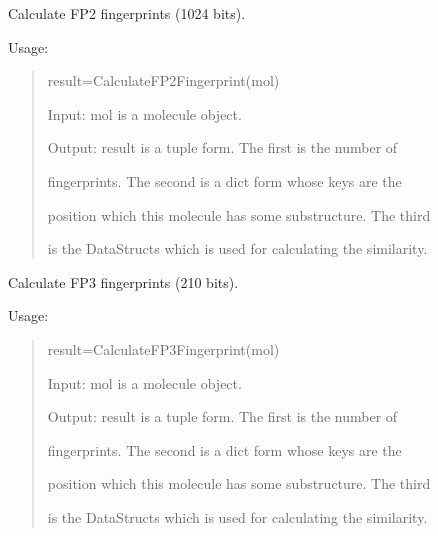 \documentclass[letterpaper,10pt,english]{sphinxmanual}
\begin{document}
\begin{fulllineitems}
\label{reference/fingerprint:fingerprint.CalculateFP2Fingerprint}
Calculate FP2 fingerprints (1024 bits).

Usage:
\begin{quote}

result=CalculateFP2Fingerprint(mol)

Input: mol is a molecule object.

Output: result is a tuple form. The first is the number of

fingerprints. The second is a dict form whose keys are the

position which this molecule has some substructure. The third

is the DataStructs which is used for calculating the similarity.
\end{quote}

\end{fulllineitems}


\begin{fulllineitems}
\label{reference/fingerprint:fingerprint.CalculateFP3Fingerprint}
Calculate FP3 fingerprints (210 bits).

Usage:
\begin{quote}

result=CalculateFP3Fingerprint(mol)

Input: mol is a molecule object.

Output: result is a tuple form. The first is the number of

fingerprints. The second is a dict form whose keys are the

position which this molecule has some substructure. The third

is the DataStructs which is used for calculating the similarity.
\end{quote}

\end{fulllineitems}

\end{document}
